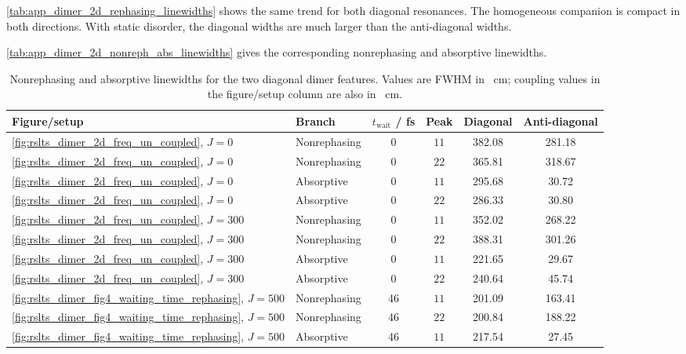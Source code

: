 \autoref{tab:app_dimer_2d_rephasing_linewidths} shows the same trend for both
diagonal resonances. The homogeneous companion is compact in both directions.
With static disorder, the diagonal widths are much larger than the
anti-diagonal widths.

\autoref{tab:app_dimer_2d_nonreph_abs_linewidths} gives the corresponding
nonrephasing and absorptive linewidths.

\begin{table}[htbp]
    \centering
    \scriptsize
    \caption{Nonrephasing and absorptive linewidths for the two diagonal dimer
    features. Values are FWHM in \si{\per\centi\metre}; coupling values in the
    figure/setup column are also in \si{\per\centi\metre}.}
    \label{tab:app_dimer_2d_nonreph_abs_linewidths}
    \begin{tabular}{@{}llcccc@{}}
        \toprule
        Figure/setup & Branch & $t_{\mathrm{wait}}$ / fs & Peak & Diagonal & Anti-diagonal \\
        \midrule
        \autoref{fig:rslts_dimer_2d_freq_un_coupled}, $J=0$ & Nonrephasing & 0 & $11$ & 382.08 & 281.18 \\
        \autoref{fig:rslts_dimer_2d_freq_un_coupled}, $J=0$ & Nonrephasing & 0 & $22$ & 365.81 & 318.67 \\
        \autoref{fig:rslts_dimer_2d_freq_un_coupled}, $J=0$ & Absorptive & 0 & $11$ & 295.68 & 30.72 \\
        \autoref{fig:rslts_dimer_2d_freq_un_coupled}, $J=0$ & Absorptive & 0 & $22$ & 286.33 & 30.80 \\
        \autoref{fig:rslts_dimer_2d_freq_un_coupled}, $J=300$ & Nonrephasing & 0 & $11$ & 352.02 & 268.22 \\
        \autoref{fig:rslts_dimer_2d_freq_un_coupled}, $J=300$ & Nonrephasing & 0 & $22$ & 388.31 & 301.26 \\
        \autoref{fig:rslts_dimer_2d_freq_un_coupled}, $J=300$ & Absorptive & 0 & $11$ & 221.65 & 29.67 \\
        \autoref{fig:rslts_dimer_2d_freq_un_coupled}, $J=300$ & Absorptive & 0 & $22$ & 240.64 & 45.74 \\
        \autoref{fig:rslts_dimer_fig4_waiting_time_rephasing}, $J=500$ & Nonrephasing & 46 & $11$ & 201.09 & 163.41 \\
        \autoref{fig:rslts_dimer_fig4_waiting_time_rephasing}, $J=500$ & Nonrephasing & 46 & $22$ & 200.84 & 188.22 \\
        \autoref{fig:rslts_dimer_fig4_waiting_time_rephasing}, $J=500$ & Absorptive & 46 & $11$ & 217.54 & 27.45 \\

\end{tabular}
\end{table}
